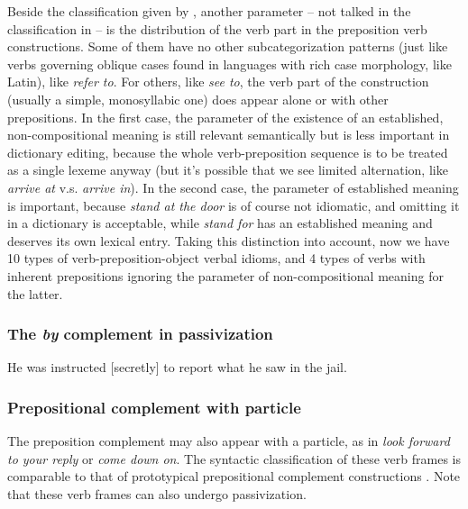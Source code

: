 \documentclass[UTF8, a4paper, oneside, scheme=plain, 12pt]{ctexbook}
\newcommand*{\citepage}[1]{p.~{#1}}
\newcommand{\form}[1]{\emph{#1}}
\begin{document}
Beside the classification given by ,
another parameter -- not talked in the classification in \citet{cgel}
-- is the distribution of the verb part in the preposition verb constructions.
Some of them have no other subcategorization patterns
(just like verbs governing oblique cases found in languages with rich case morphology, like Latin),
like \form{refer to}.
For others, like \form{see to},
the verb part of the construction (usually a simple, monosyllabic one)
does appear alone or with other prepositions.
In the first case,
the parameter of the existence of an established, 
non-compositional meaning 
is still relevant semantically \citep[\citepage{291}]{dixon2005semantic} 
but is less important in dictionary editing,
because the whole verb-preposition sequence is to be treated as a single lexeme anyway 
(but it's possible that we see limited alternation, 
like \form{arrive at} v.s. \form{arrive in}).
In the second case,
the parameter of established meaning is important,
because \form{stand at the door} is of course not idiomatic,
and omitting it in a dictionary is acceptable,
while \form{stand for} has an established meaning
and deserves its own lexical entry.
Taking this distinction into account, 
now we have 10 types of verb-preposition-object verbal idioms,
and 4 types of verbs with inherent prepositions 
ignoring the parameter of non-compositional meaning for the latter.

\subsubsection{The \form{by} complement in passivization}\label{sec:valency.overview.by-phrase}

\begin{exe}
    \ex He was instructed [secretly] to report what he saw in the jail.
\end{exe}

\subsubsection{Prepositional complement with particle}

The preposition complement may also appear with a particle,
as in \form{look forward to your reply} or \form{come down on}.
The syntactic classification of these verb frames is comparable to 
that of prototypical prepositional complement constructions
\citep[\citepage{287}, {[49]}]{cgel}.
Note that these verb frames can also undergo passivization.
\end{document}
